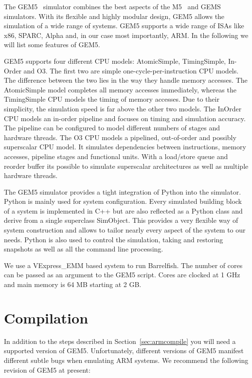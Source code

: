 \documentclass[a4paper,twoside]{report} %
\begin{document}
The GEM5~\cite{gem5:sigarch11} simulator combines the best aspects of
the M5~\cite{m5:micro06} and GEMS~\cite{gems:sigarch05}
simulators. With its flexible and highly modular design, GEM5 allows
the simulation of a wide range of systems. GEM5 supports a wide range
of ISAs like x86, SPARC, Alpha and, in our case most importantly,
ARM. In the following we will list some features of GEM5.

GEM5 supports four different CPU models: AtomicSimple, TimingSimple,
In-Order and O3. The first two are simple one-cycle-per-instruction
CPU models. The difference between the two lies in the way they handle
memory accesses. The AtomicSimple model completes all memory accesses
immediately, whereas the TimingSimple CPU models the timing of memory
accesses. Due to their simplicity, the simulation speed is far above
the other two models.  The InOrder CPU models an in-order pipeline and
focuses on timing and simulation accuracy. The pipeline can be
configured to model different numbers of stages and hardware threads.
The O3 CPU models a pipelined, out-of-order and possibly superscalar
CPU model. It simulates dependencies between instructions, memory
accesses, pipeline stages and functional units. With a load/store
queue and reorder buffer its possible to simulate superscalar
architectures as well as multiple hardware threads.

The GEM5 simulator provides a tight integration of Python into the
simulator. Python is mainly used for system configuration. Every
simulated building block of a system is implemented in C++ but are
also reflected as a Python class and derive from a single superclass
SimObject. This provides a very flexible way of system construction
and allows to tailor nearly every aspect of the system to our needs.
Python is also used to control the simulation, taking and restoring
snapshots as well as all the command line processing.

We use a VExpress\_EMM based system to run Barrelfish. The number of
cores can be passed as an argument to the GEM5 script. Cores are
clocked at 1 GHz and main memory is 64 MB starting at 2 GB.

\section{Compilation}

In addition to the steps described in Section~\ref{sec:armcompile} you
will need a supported version of GEM5.  Unfortunately, different
versions of GEM5 manifest different subtle bugs when emulating ARM
systems.  We recommend the following revision of GEM5 at present:
\end{document}
